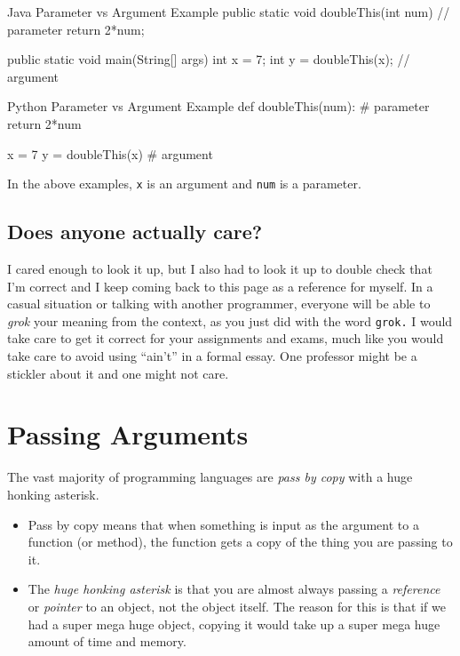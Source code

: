 \begin{javacode}{Java Parameter vs Argument Example}
public static void doubleThis(int num) {   // parameter
	return 2*num;
}

public static void main(String[] args){
	int x = 7;
	int y = doubleThis(x);  // argument
}

\end{javacode}

\begin{pycode}{Python Parameter vs Argument Example}
def doubleThis(num): # parameter
	return 2*num
		
x = 7
y = doubleThis(x) # argument
\end{pycode}

In the above examples, \texttt{x} is an argument and \texttt{num} is a parameter.


\subsection{Does anyone actually care?}

I cared enough to look it up, but I also had to look it up to double check that I'm correct and I keep coming back to this page as a reference for myself.  
In a casual situation or talking with another programmer, everyone will be able to \textit{grok} your meaning from the context, as you just did with the word \texttt{grok.} I would take care to get it correct for your assignments and exams, much like you would take care to avoid using ``ain't'' in a formal essay.  One professor might be a stickler about it and one might not care.

\section{Passing Arguments}

The vast majority of programming languages are \textit{pass by copy} with a huge honking asterisk.
\begin{itemize}
	\item Pass by copy means that when something is input as the argument to a function (or method), the function gets a copy of the thing you are passing to it.
	\item The \textit{huge honking asterisk} is that you are almost always passing a \textit{reference} or \textit{pointer} to an object, not the object itself.  The reason for this is that if we had a super mega huge object, copying it would take up a super mega huge amount of time and memory.
\end{itemize}



